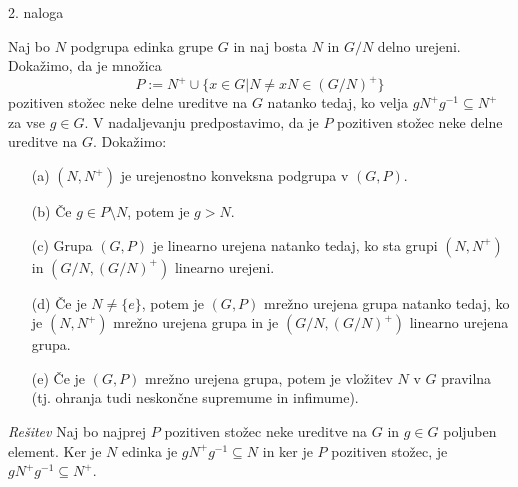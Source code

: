 \documentclass[a4paper, 12pt]{article}
\begin{document}
\begin{flushleft}
2. naloga
\end{flushleft}
Naj bo $N$ podgrupa edinka grupe $G$ in naj bosta $N$ in $G/N$ delno urejeni. Dokažimo, da je množica 
$$
P:= N^+ \cup \{x\in G | N \neq xN \in (G/N)^+ \}
$$
pozitiven stožec neke delne ureditve na $G$ natanko tedaj, ko velja $gN^+g^{-1} \subseteq N^+$ za vse $g\in G$. V nadaljevanju predpostavimo, da je $P$ pozitiven stožec neke delne ureditve na $G$. Dokažimo:
\begin{enumerate}
\item[(a)] $(N,N^+)$ je urejenostno konveksna podgrupa v $(G,P)$.
\item[(b)] Če $g\in P\setminus N$, potem je $g > N$.
\item[(c)] Grupa $(G,P)$ je linearno urejena natanko tedaj, ko sta grupi $(N,N^+)$ in $(G/N, (G/N)^+)$ linearno urejeni.
\item[(d)] Če je $N\neq \{e\}$, potem je $(G,P)$ mrežno urejena grupa natanko tedaj, ko je $(N,N^+)$ mrežno urejena grupa in je $(G/N, (G/N)^+)$ linearno urejena grupa.
\item[(e)] Če je $(G,P)$ mrežno urejena grupa, potem je vložitev $N$ v $G$ pravilna (tj. ohranja tudi neskončne supremume in infimume).
\end{enumerate}
\emph{Rešitev}
\newline
Naj bo najprej $P$ pozitiven stožec neke ureditve na $G$ in $g\in G$ poljuben element. Ker je $N$ edinka je $gN^+ g^{-1} \subseteq N$ in ker je $P$ pozitiven stožec, je $gN^+ g^{-1} \subseteq N^+$.
\end{document}
